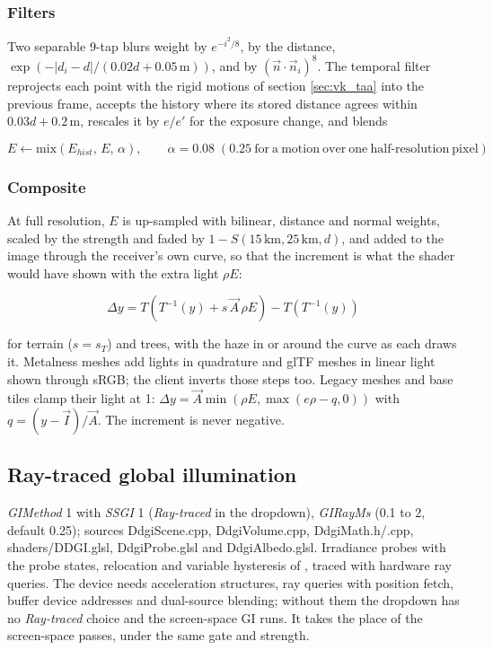 \documentclass[Orbiter Technical Reference.tex]{subfiles}
\begin{document}
\begin{sloppypar}
\subsubsection{Filters}
Two separable 9-tap blurs weight by $e^{-i^{2}/8}$, by the distance, $\exp(-|d_{i} - d|/(0.02d + 0.05\,\mathrm{m}))$, and by $(\vec{n}\cdot\vec{n}_{i})^{8}$. The temporal filter reprojects each point with the rigid motions of section \ref{sec:vk_taa} into the previous frame, accepts the history where its stored distance agrees within $0.03d + 0.2$\,m, rescales it by $e/e'$ for the exposure change, and blends

\[ E \leftarrow \mathrm{mix}(E_{hist},\, E,\, \alpha), \qquad \alpha = 0.08 \;(0.25 \mathrm{\ for\ a\ motion\ over\ one\ half\mbox{-}resolution\ pixel}) \]

\subsubsection{Composite}
At full resolution, $E$ is up-sampled with bilinear, distance and normal weights, scaled by the strength and faded by $1 - S(15\,\mathrm{km}, 25\,\mathrm{km}, d)$, and added to the image through the receiver's own curve, so that the increment is what the shader would have shown with the extra light $\rho E$:

\[ \Delta y = T\left(T^{-1}(y) + s\,\vec{A}\,\rho E\right) - T\left(T^{-1}(y)\right) \]

\noindent
for terrain ($s = s_{T}$) and trees, with the haze in or around the curve as each draws it. Metalness meshes add lights in quadrature and glTF meshes in linear light shown through sRGB; the client inverts those steps too. Legacy meshes and base tiles clamp their light at 1: $\Delta y = \vec{A}\min(\rho E, \max(e\rho - q, 0))$ with $q = (y - \vec{I})/\vec{A}$. The increment is never negative.



\subsection{Ray-traced global illumination}\label{sec:vk_ddgi}
\textit{GIMethod} 1 with \textit{SSGI} 1 (\textit{Ray-traced} in the dropdown), \textit{GIRayMs} (0.1 to 2, default 0.25); sources DdgiScene.cpp, DdgiVolume.cpp, DdgiMath.h/.cpp, shaders/DDGI.glsl, DdgiProbe.glsl and DdgiAlbedo.glsl. Irradiance probes \cite{majercik2019} with the probe states, relocation and variable hysteresis of \cite{majercik2021}, traced with hardware ray queries. The device needs acceleration structures, ray queries with position fetch, buffer device addresses and dual-source blending; without them the dropdown has no \textit{Ray-traced} choice and the screen-space GI runs. It takes the place of the screen-space passes, under the same gate and strength.


\end{sloppypar}
\end{document}
